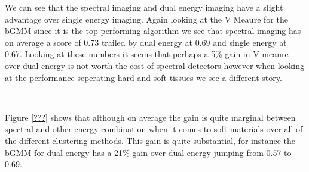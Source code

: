 \documentclass[11pt]{article}
\begin{document}
    We can see that the spectral imaging and dual energy imaging have a
slight advantage over single energy imaging. Again looking at the V
Meaure for the bGMM since it is the top performing algorithm we see that
spectral imaging has on average a score of 0.73 trailed by dual energy
at 0.69 and single energy at 0.67. Looking at these numbers it seems
that perhaps a 5\% gain in V-meaure over dual energy is not worth the
cost of spectral detectors however when looking at the performance
seperating hard and soft tissues we see a different story.






    \begin{center}
    \end{center}
    { \hspace*{\fill} \\}
    
    Figure \ref{???} shows that although on average the gain is quite
marginal between spectral and other energy combination when it comes to
soft materials over all of the different clustering methods. This gain
is quite substantial, for instance the bGMM for dual energy has a 21\%
gain over dual energy jumping from 0.57 to 0.69.



    \begin{center}
    \end{center}
    { \hspace*{\fill} \\}
    


    \begin{center}
    \end{center}
    { \hspace*{\fill} \\}
    
\end{document}
